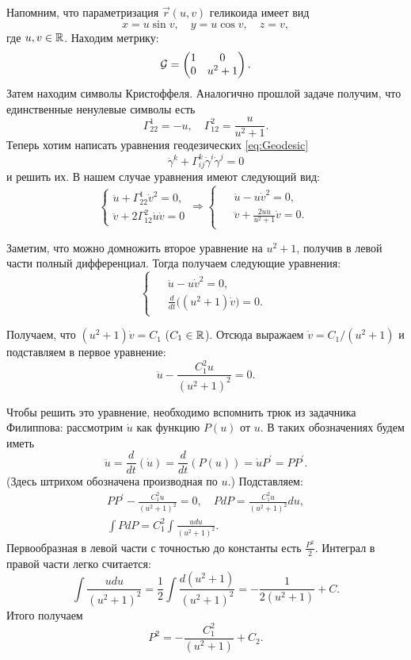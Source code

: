 \begin{solution}
	Напомним, что параметризация $\vec{r}(u, v)$ геликоида имеет вид
	\[
		x = u\sin v,\quad y = u\cos v,\quad z = v,
	\]
	где $u, v \in \mathbb{R}$. Находим метрику:
	\[
		\mathcal{G} =
		\begin{pmatrix}
			1 & 0\\
			0 & u^2 + 1
		\end{pmatrix}.
	\]
	Затем находим символы Кристоффеля. Аналогично прошлой задаче получим, что единственные ненулевые символы есть
	\[
		\Gamma_{22}^1 = -u,\quad \Gamma_{12}^2 = \frac{u}{u^2 + 1}.
	\]
	Теперь хотим написать уравнения геодезических \eqref{eq:Geodesic}
	\[
		\ddot{\gamma}^k + \Gamma_{ij}^k\dot{\gamma}^i\dot{\gamma}^j = 0
	\]
	и решить их. В нашем случае уравнения имеют следующий вид:
	\[
		\begin{cases}
			\ddot{u} + \Gamma_{22}^1\dot{v}^2 = 0,\\
			\ddot{v} + 2\Gamma_{12}^2\dot{u}\dot{v} = 0
		\end{cases} \Rightarrow
		\begin{cases}
			\begin{aligned}
				&\ddot{u} - u\dot{v}^2 = 0,\\
				&\ddot{v} + \frac{2u\dot{u}}{u^2 + 1}\dot{v} = 0.
			\end{aligned}
		\end{cases}
	\]

	Заметим, что можно домножить второе уравнение на $u^2 + 1$, получив в левой части полный дифференциал. Тогда получаем следующие уравнения:
	\[
		\begin{cases}
			\begin{aligned}
				&\ddot{u} - u\dot{v}^2 = 0,\\
				&\frac{d}{dt}\big((u^2 + 1)\dot{v}\big) = 0.
			\end{aligned}
		\end{cases}
	\]

	Получаем, что $(u^2 + 1)\dot{v} = C_1$ ($C_1 \in \mathbb{R}$). Отсюда выражаем $\dot{v} = C_1 / (u^2 + 1)$ и подставляем в первое уравнение:
	\[
		\ddot{u} - \frac{C_1^2u}{(u^2 + 1)^2} = 0.
	\]

	Чтобы решить это уравнение, необходимо вспомнить трюк из задачника Филиппова: рассмотрим $\dot{u}$ как функцию $P(u)$ от $u$. В таких обозначениях будем иметь
	\[
		\ddot{u} = \frac{d}{dt}(\dot{u}) = \frac{d}{dt}(P(u)) = \dot{u}P^\prime = PP^\prime.
	\]
	(Здесь штрихом обозначена производная по $u$.) Подставляем:
	\begin{gather*}
		PP^\prime - \frac{C_1^2u}{(u^2 + 1)^2} = 0,\quad PdP = \frac{C_1^2u}{(u^2 + 1)^2}du,\\
		\int PdP = C_1^2\int\frac{udu}{(u^2 + 1)^2}.
	\end{gather*}
	Первообразная в левой части с точностью до константы есть $\frac{P^2}{2}$. Интеграл в правой части легко считается:
	\[
		\int\frac{udu}{(u^2 + 1)^2} = \frac{1}{2}\int\frac{d(u^2 + 1)}{(u^2 + 1)^2} = -\frac{1}{2(u^2 + 1)} + C.
	\]
	Итого получаем
	\[
		P^2 = -\frac{C_1^2}{(u^2 + 1)} + C_2.
	\]


\end{solution}
